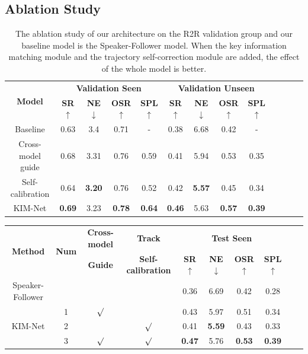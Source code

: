 \subsection{Ablation Study}
\vspace{-2em}
\begin{table}[h]
	\centering
	\caption{The ablation study of our architecture on the R2R validation group and our baseline model is the Speaker-Follower model. When the key information matching module and the trajectory self-correction module are added, the effect of the whole model is better.}
	{\begin{tabular}[c]{ccccccccccccc}
			\toprule[1pt]
			\multirow{2}{*}{{\textbf{Model}}} & \multicolumn{4}{c}{{\textbf{Validation Seen}}} & \multicolumn{4}{c}{{\textbf{Validation Unseen}}}\\
			
			& \textbf{SR}$\uparrow$ & \textbf{NE}$\downarrow$ & \textbf{OSR}$\uparrow$ & \textbf{SPL}$\uparrow$	& \textbf{SR}$\uparrow$ & \textbf{NE}$\downarrow$ & \textbf{OSR}$\uparrow$ & \textbf{SPL}$\uparrow$ & \\
			\toprule[1pt]
			
			Baseline   & 0.63 & 3.4 & 0.71 & - & 0.38 & 6.68 & 0.42 & -\\
			Cross-model guide  & 0.68 &  3.31 &  0.76 & 0.59 & 0.41 & 5.94 & 0.53  & 0.35 \\
			Self-calibration    & 0.64 & \textbf{3.20} & 0.76 & 0.52 & 0.42 & \textbf{5.57} & 0.45 & 0.34 \\
			KIM-Net & \textbf{0.69} &  3.23 & \textbf{0.78} & \textbf{0.64} & \textbf{0.46} & 5.63 & \textbf{0.57} & \textbf{0.39} \\
			
			\bottomrule[1pt]
		\end{tabular}
		\label{table_1}}
\end{table}
\vspace{-2em}
\begin{table}[h]
	\centering
	{\begin{tabular}[c]{cccccccccc}
			\toprule[1pt]
			\multirow{2}{*}{{\textbf{Method}}} & \multirow{2}{*}{{\textbf{Num}}} & \multicolumn{1}{c}{{\textbf{Cross-model}}}  & \multicolumn{1}{c}{{\textbf{Track}} } &\multicolumn{4}{c}{{\textbf{Test Seen}}} \\
			
			& &\textbf{Guide} &\textbf{Self-calibration} & \textbf{SR}$\uparrow$ & \textbf{NE}$\downarrow$ & \textbf{OSR}$\uparrow$ & \textbf{SPL}$\uparrow$\\
			\toprule[1pt]
			
			Speaker-Follower   & & & & 0.36 & 6.69 & 0.42 & 0.28 \\
			\toprule[1pt]
			\multirow{3}{*}{KIM-Net}  &1& $\surd$ & & 0.43 &  5.97 &  0.51 & 0.34  \\
			   &2& & $\surd$ & 0.41 & \textbf{5.59} & 0.43 & 0.33  \\
				 &3& $\surd$ & $\surd$ & \textbf{0.47} &  5.76 & \textbf{0.53} & \textbf{0.39} \\
			\bottomrule[1pt]
		\end{tabular}
		\label{table_2}}
\end{table}
